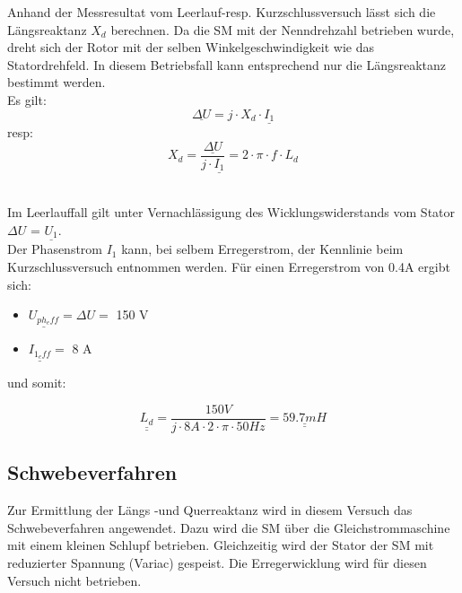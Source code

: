\begin{flushleft}
Anhand der Messresultat vom Leerlauf-resp. Kurzschlussversuch lässt sich die Längsreaktanz $X_d$ berechnen. Da die SM mit der Nenndrehzahl betrieben wurde, dreht sich der Rotor mit der selben Winkelgeschwindigkeit wie das Statordrehfeld. In diesem Betriebsfall kann entsprechend nur die Längsreaktanz bestimmt werden.\\

Es gilt:\\

\vspace{0.3cm}
$$\underline{\Delta U} = j \cdot X_d \cdot \underline{I_1}$$
resp:\\
\vspace{0.3cm}
$$ X_d = \frac{\underline{\Delta U}}{j \cdot \underline{I_1}}  = 2 \cdot \pi \cdot f \cdot L_d$$\\

\vspace{0.5cm}


Im Leerlauffall gilt unter Vernachlässigung des Wicklungswiderstands vom Stator \\$\Delta U$ = $\underline{U_{1}}$. \\
Der Phasenstrom $I_1$ kann, bei selbem Erregerstrom, der Kennlinie beim Kurzschlussversuch entnommen werden. Für einen Erregerstrom von 0.4A ergibt sich:\\
\vspace{0.3cm}
\begin{itemize}
\item $\underline{U_{ph_eff}} = \Delta U = $ 150 V
\item $\underline{I_{1_eff}} = $ 8 A
\end{itemize}


und somit:

$$\underline{\underline{L_d}} = \frac{150 V }{j \cdot 8 A \cdot 2 \cdot \pi \cdot 50 Hz} = \underline{\underline{59.7 mH}}$$

\newpage



\subsection{Schwebeverfahren} \label{schwebeverfahren}
Zur Ermittlung der Längs -und Querreaktanz wird in diesem Versuch das Schwebeverfahren angewendet. Dazu wird die SM über die Gleichstrommaschine mit einem kleinen Schlupf betrieben. Gleichzeitig wird der Stator der SM mit reduzierter Spannung (Variac) gespeist. Die Erregerwicklung wird für diesen Versuch nicht betrieben.\\
\vspace{0.4cm}



\end{flushleft}
